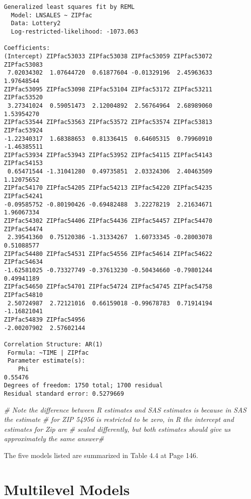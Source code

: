 \documentclass[]{book}
\newenvironment{Shaded}{\begin{snugshade}}{\end{snugshade}}
\newcommand{\CommentTok}[1]{\textcolor[rgb]{0.56,0.35,0.01}{\textit{#1}}}
\begin{document}
\begin{verbatim}
Generalized least squares fit by REML
  Model: LNSALES ~ ZIPfac 
  Data: Lottery2 
  Log-restricted-likelihood: -1073.063

Coefficients:
(Intercept) ZIPfac53033 ZIPfac53038 ZIPfac53059 ZIPfac53072 ZIPfac53083 
 7.02034302  1.07644720  0.61877604 -0.01329196  2.45963633  1.97648544 
ZIPfac53095 ZIPfac53098 ZIPfac53104 ZIPfac53172 ZIPfac53211 ZIPfac53520 
 3.27341024  0.59051473  2.12004892  2.56764964  2.68989060  1.53954270 
ZIPfac53544 ZIPfac53563 ZIPfac53572 ZIPfac53574 ZIPfac53813 ZIPfac53924 
-1.22340317  1.68388653  0.81336415  0.64605315  0.79960910 -1.46385511 
ZIPfac53934 ZIPfac53943 ZIPfac53952 ZIPfac54115 ZIPfac54143 ZIPfac54153 
 0.65471544 -1.31041280  0.49735851  2.03324306  2.40463509  1.12075652 
ZIPfac54170 ZIPfac54205 ZIPfac54213 ZIPfac54220 ZIPfac54235 ZIPfac54241 
-0.09585752 -0.80190426 -0.69482488  3.22278219  2.21634671  1.96067334 
ZIPfac54302 ZIPfac54406 ZIPfac54436 ZIPfac54457 ZIPfac54470 ZIPfac54474 
 2.39541360  0.75120386 -1.31334267  1.60733345 -0.28003078  0.51088577 
ZIPfac54480 ZIPfac54531 ZIPfac54556 ZIPfac54614 ZIPfac54622 ZIPfac54634 
-1.62581025 -0.73327749 -0.37613230 -0.50434660 -0.79801244  0.49941189 
ZIPfac54650 ZIPfac54701 ZIPfac54724 ZIPfac54745 ZIPfac54758 ZIPfac54810 
 2.50724987  2.72121016  0.66159018 -0.99678783  0.71914194 -1.16821041 
ZIPfac54839 ZIPfac54956 
-2.00207902  2.57602144 

Correlation Structure: AR(1)
 Formula: ~TIME | ZIPfac 
 Parameter estimate(s):
    Phi 
0.55476 
Degrees of freedom: 1750 total; 1700 residual
Residual standard error: 0.5279669 
\end{verbatim}

\begin{Shaded}
\begin{Highlighting}[]
\CommentTok{# Note the difference between R estimates and SAS estimates is because in SAS the estimate }
\CommentTok{# for ZIP 54956 is restricted to be zero, in R the intercept and estimates for Zip are }
\CommentTok{# scaled differently, but both estimates should give us approximately the same answer#}
\end{Highlighting}
\end{Shaded}

The five models listed are summarized in Table 4.4 at Page 146.

\hypertarget{multilevel-models}{%
\chapter{Multilevel Models}\label{multilevel-models}}
\end{document}
